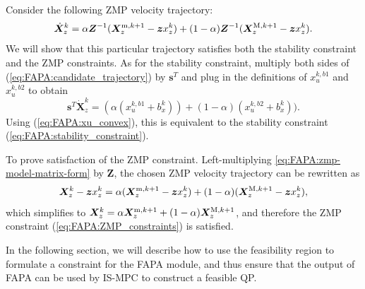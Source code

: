 Consider the following ZMP velocity trajectory:
\begin{equation}\label{eq:FAPA:candidate_trajectory}
\dot{\bm{X}}_z^k = \alpha \bm{Z}^{-1}(\bm{X}_z^{{\rm m}, k+1} - \bm{z} x_z^k) + (1-\alpha)\bm{Z}^{-1}(\bm{X}_z^{{\rm M}, k+1} - \bm{z} x_z^k).
\end{equation}
We will show that this particular trajectory satisfies both the stability constraint and the ZMP constraints. As for the stability constraint, multiply both sides of (\ref{eq:FAPA:candidate_trajectory}) by $\bm{s}^T$
and plug in the definitions of $x_u^{k,b1}$ and $x_u^{k,b2}$ to obtain
\begin{equation*}
\bm{s}^T\dot{\bm X}_z^k = (\alpha (x_u^{k,b1} + b^k_x)) + (1-\alpha)(x_u^{k,b2} + b^k_x)).
\end{equation*}
Using (\ref{eq:FAPA:xu_convex}), this is equivalent to the stability constraint (\ref{eq:FAPA:stability_constraint}).

To prove satisfaction of the ZMP constraint. Left-multiplying \eqref{eq:FAPA:zmp-model-matrix-form} by $\bm{Z}$, the chosen ZMP velocity trajectory can be rewritten as
\begin{equation*}
\bm{X}_z^k - \bm{z} x_z^k = \alpha (\bm{X}_z^{{\rm m}, k+1} - \bm{z} x_z^k) + (1-\alpha)(\bm{X}_z^{{\rm M}, k+1} - \bm{z} x_z^k),
\end{equation*}
which simplifies to
$\bm{X}_z^k = \alpha \bm{X}_z^{{\rm m}, k+1} + (1-\alpha)\bm{X}_z^{{\rm M}, k+1}$,
and therefore the ZMP constraint (\ref{eq:FAPA:ZMP_constraints}) is satisfied. \hfill\bull

In the following section, we will describe how to use the feasibility region to formulate a constraint for the FAPA module, and thus ensure that the output of FAPA can be used by IS-MPC to construct a feasible QP.

